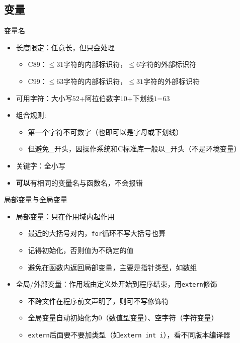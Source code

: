 \documentclass[UTF8]{ctexbeamer}
\begin{document}
\subsection{变量}
\begin{frame}
\subsectionpage
\end{frame}

\begin{frame}{变量名}
\begin{itemize}
	\item<1-> 长度限定：任意长，但只会处理
	\begin{itemize}
		\item C89：$\leq 31$字符的内部标识符，$\leq 6$字符的外部标识符
		\item C99：$\leq 63$字符的内部标识符，$\leq 31$字符的外部标识符
	\end{itemize}
	\item<2-> 可用字符：大小写$52$+阿拉伯数字$10$+下划线$1$=$63$
	\item<2-> 组合规则:
	\begin{itemize}
		\item 第一个字符不可数字（也即可以是字母或下划线）
		\item 但避免\_开头，因操作系统和C标准库一般以\_开头（不是环境变量）
	\end{itemize}
	\item<3-> 关键字：全小写
	\item<3-> \textbf{可以}有相同的变量名与函数名，不会报错
\end{itemize}
\end{frame}

\begin{frame}[fragile]{局部变量与全局变量}
\begin{itemize}
	\item 局部变量：只在作用域内起作用
	\begin{itemize}[<+->]
		\item 最近的大括号对内，\verb'for'循环不写大括号也算
		\item 记得初始化，否则值为不确定的值
		\item 避免在函数内返回局部变量，主要是指针类型，如数组
	\end{itemize}
	\item 全局/外部变量：作用域由定义处开始到程序结束，用\verb'extern'修饰
	\begin{itemize}[<+->]
		\item 不跨文件在程序前文声明了，则可不写修饰符
		\item 全局变量自动初始化为0（数值型变量）、空字符（字符变量）
		\item \verb'extern'后面要不要加类型（如\verb'extern int i'），看不同版本编译器
	\end{itemize}
\end{itemize}
\end{frame}
\end{document}
